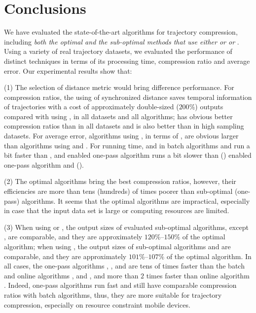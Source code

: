 \vspace{-1ex}
\section{Conclusions}

We have evaluated the state-of-the-art \lsa algorithms for trajectory compression, including \emph{both the optimal and the sub-optimal methods that use either \ped or \sed or \dad}.
Using a variety of real trajectory datasets, we evaluated the performance of distinct techniques in terms of its processing time, compression ratio and average error.
Our experimental results show that:

(1) The selection of distance metric would bring difference performance.
For compression ratios, the using of synchronized distance \sed saves temporal information of trajectories with a cost of approximately double-sized (\ie $200\%$) outputs compared with using \ped, in all datasets and all algorithms; \ped has obvious better compression ratios than \dad in all datasets and \sed is also better than \dad in high sampling datasets.
For average error, algorithms using \dad, in terms of \ped, are obvious larger than algorithms using \ped and \sed.
For running time, \sed and \dad in batch algorithms \dpa and \tpa run a bit faster than \ped, and \sed enabled one-pass algorithm \cised runs a bit slower than \ped (\dad) enabled one-pass algorithm \siped and \operb (\interval).

(2) The optimal algorithms bring the best compression ratios, however, their efficiencies are more than tens (hundreds) of times poorer than sub-optimal (one-pass) algorithms. It seems that the optimal algorithms are impractical, especially in case that the input data set is large or computing resources are limited.

(3) When using \ped or \sed, the output sizes of evaluated sub-optimal algorithms, except \squishe, are comparable, and they are approximately $120\%$--$150\%$ of the optimal algorithm; when using \dad, the output sizes of sub-optimal algorithms \tpa and \interval are comparable, and they are approximately $101\%$--$107\%$ of the optimal algorithm. In all cases, the one-pass algorithms \siped, \operb, \cised and \interval are tens of times faster than the batch and online algorithms \tpa, \dpa and \bqsa, and more than $2$ times faster than online algorithm \squishe. Indeed, one-pass algorithms run fast and still have comparable compression ratios with batch algorithms, thus, they are more suitable for trajectory compression, especially on resource constraint mobile devices.

